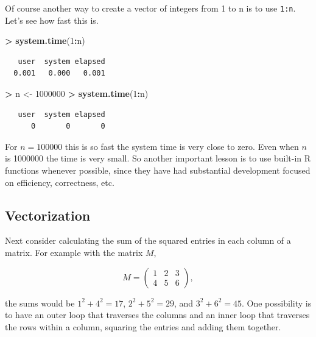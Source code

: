 \documentclass[]{krantz}
\makeatletter
\newenvironment{Shaded}{\begin{snugshade}}{\end{snugshade}}
\newcommand{\KeywordTok}[1]{\textcolor[rgb]{0.27,0.27,0.27}{\textbf{#1}}}
\newcommand{\DecValTok}[1]{\textcolor[rgb]{0.06,0.06,0.06}{#1}}
\newcommand{\StringTok}[1]{\textcolor[rgb]{0.5,0.5,0.5}{#1}}
\newcommand{\OperatorTok}[1]{\textcolor[rgb]{0.43,0.43,0.43}{\textbf{#1}}}
\newcommand{\NormalTok}[1]{#1}
\newenvironment{kframe}{%
\medskip{}
\setlength{\fboxsep}{.8em}
 \def\at@end@of@kframe{}%
 \ifinner\ifhmode%
  \def\at@end@of@kframe{\end{minipage}}%
  \begin{minipage}{\columnwidth}%
 \fi\fi%
 \def\FrameCommand##1{\hskip\@totalleftmargin \hskip-\fboxsep
 \colorbox{shadecolor}{##1}\hskip-\fboxsep
     \hskip-\linewidth \hskip-\@totalleftmargin \hskip\columnwidth}%
 \MakeFramed {\advance\hsize-\width
   \@totalleftmargin\z@ \linewidth\hsize
   \@setminipage}}%
 {\par\unskip\endMakeFramed%
 \at@end@of@kframe}
\renewenvironment{Shaded}{\begin{kframe}}{\end{kframe}}
\makeatother
\begin{document}
Of course another way to create a vector of integers from 1 to n is to
use \texttt{1:n}. Let's see how fast this is.

\begin{Shaded}
\begin{Highlighting}[]
\OperatorTok{>}\StringTok{ }\KeywordTok{system.time}\NormalTok{(}\DecValTok{1}\OperatorTok{:}\NormalTok{n)}
\end{Highlighting}
\end{Shaded}

\begin{verbatim}
   user  system elapsed 
  0.001   0.000   0.001 
\end{verbatim}

\begin{Shaded}
\begin{Highlighting}[]
\OperatorTok{>}\StringTok{ }\NormalTok{n <-}\StringTok{ }\DecValTok{1000000}
\OperatorTok{>}\StringTok{ }\KeywordTok{system.time}\NormalTok{(}\DecValTok{1}\OperatorTok{:}\NormalTok{n)      }
\end{Highlighting}
\end{Shaded}

\begin{verbatim}
   user  system elapsed 
      0       0       0 
\end{verbatim}

For \(n=100000\) this is so fast the system time is very close to zero.
Even when \(n\) is 1000000 the time is very small. So another important
lesson is to use built-in R functions whenever possible, since they have
had substantial development focused on efficiency, correctness, etc.

\subsection{Vectorization}\label{vectorization}

Next consider calculating the sum of the squared entries in each column
of a matrix. For example with the matrix \(M\),

\[
M = \left(\begin{array}{ccc}
1 & 2 & 3 \\
4 & 5 & 6
\end{array}\right),
\]

the sums would be \(1^2 + 4^2 = 17\), \(2^2 + 5^2 = 29\), and
\(3^2 + 6^2 = 45\). One possibility is to have an outer loop that
traverses the columns and an inner loop that traverses the rows within a
column, squaring the entries and adding them together.
\end{document}
